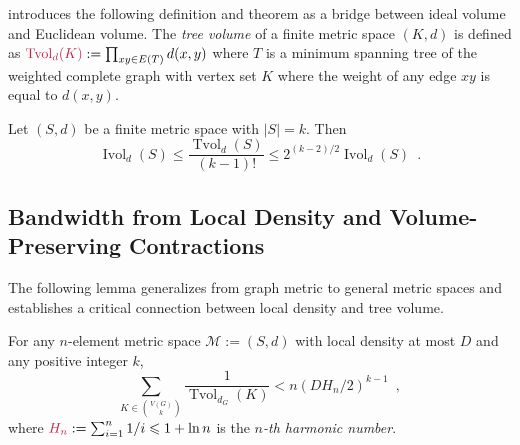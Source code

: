 \documentclass{patmorin}
\makeatletter
\renewcommand{\le}{\leqslant}
\newcommand{\defin}[1]{\emph{\textcolor{brightmaroon}{#1}}}
\def\mathcolor#1#{\@mathcolor{#1}}
\def\@mathcolor#1#2#3{%
  \protect\leavevmode
  \begingroup
    \color#1{#2}#3%
  \endgroup
}
\newcommand{\mathdefin}[1]{\mathcolor{brightmaroon}{#1}}
\DeclareMathOperator{\ivol}{Ivol}
\DeclareMathOperator{\tvol}{Tvol}
\makeatother
\begin{document}
\citet{feige:approximating} introduces the following definition and theorem as a bridge between ideal volume and Euclidean volume. The \defin{tree volume} of a finite metric space $(K,d)$ is defined as $\mathdefin{\tvol_d(K)}:=\prod_{xy\in E(T)} d(x,y)$ where $T$ is a minimum spanning tree of the weighted complete graph with vertex set $K$ where the weight of any edge $xy$ is equal to $d(x,y)$.

\begin{lem}
  Let $(S,d)$ be a finite metric space with $|S|=k$.  Then
  \[
    \ivol_{d}(S) \le \frac{\tvol_d(S)}{(k-1)!} \le 2^{(k-2)/2}\ivol_d(S) \enspace .
  \]
\end{lem}

\subsection{Bandwidth from Local Density and Volume-Preserving Contractions}

The following lemma generalizes \citet[Theorem~10]{feige:approximating} from graph metric to general metric spaces and establishes a critical connection between local density and tree volume.

\begin{lem}\label{reciprocal_sum}
  For any $n$-element metric space $\mathcal{M}:=(S,d)$ with local density at most $D$ and any positive integer $k$,
  \[
    \sum_{K\in \binom{V(G)}{k}}\frac{1}{\tvol_{d_G}(K)} < n(DH_n/2)^{k-1} \enspace ,
  \]
  where $\mathdefin{H_n}:=\sum_{i=1}^n 1/i\le 1+\ln n$ is the \defin{$n$-th harmonic number}.
\end{lem}
\end{document}
